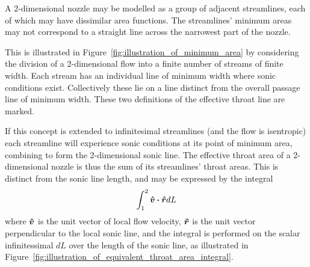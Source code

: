 \documentclass[11pt, twoside]{report}
\begin{document}
A 2-dimensional nozzle may be modelled as a group of adjacent streamlines, each of which may have dissimilar area functions. The streamlines' minimum areas may not correspond to a straight line across the narrowest part of the nozzle. 

This is illustrated in Figure~\ref{fig:illustration_of_minimum_area} by considering the division of a 2-dimensional flow into a finite number of streams of finite width. Each stream has an individual line of minimum width where sonic conditions exist. Collectively these lie on a line distinct from the overall passage line of minimum width. These two definitions of the effective throat line are marked.

If this concept is extended to infinitesimal streamlines (and the flow is isentropic) each streamline will experience sonic conditions at its point of minimum area, combining to form the 2-dimensional sonic line. The effective throat area of a 2-dimensional nozzle is thus the sum of its streamlines' throat areas. This is distinct from the sonic line length, and may be expressed by the integral
\begin{equation}
	\int_{1}^2 \vu*{v} \vdot \vu*{r} dL
\end{equation}
where $\vu*{v}$ is the unit vector of local flow velocity, $\vu*{r}$ is the unit vector perpendicular to the local sonic line, and the integral is performed on the scalar infinitessimal $dL$ over the length of the sonic line, as illustrated in Figure~\ref{fig:illustration_of_equivalent_throat_area_integral}.
 		
\end{document}
